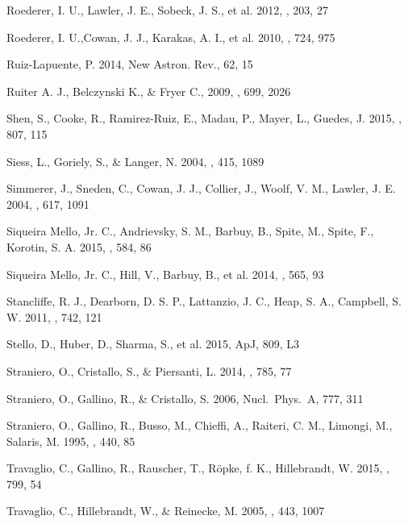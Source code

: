 \documentclass[manuscript]{aastex}
\begin{document}
\begin{thebibliography}{}
Roederer, I. U., Lawler, J. E., Sobeck, J. S., et al. 2012, \apjs, 203, 27

Roederer, I. U.,Cowan, J. J., Karakas, A. I., et al. 2010, \apj, 724, 975

Ruiz-Lapuente, P. 2014, New Astron. Rev., 62, 15

Ruiter A. J., Belczynski K., \& Fryer C., 2009, \apj, 699, 2026

Shen, S., Cooke, R., Ramirez-Ruiz, E., Madau, P., Mayer, L., Guedes, J. 2015,
\apj, 807, 115

Siess, L., Goriely, S., \& Langer, N. 2004, \aap, 415, 1089

Simmerer, J., Sneden, C., Cowan, J. J., Collier, J., Woolf, V. M., Lawler, J. E. 2004,
\apj, 617, 1091

Siqueira Mello, Jr. C., Andrievsky, S. M., Barbuy, B., Spite, M.,
Spite, F., Korotin, S. A. 2015, \aap, 584, 86

Siqueira Mello, Jr. C., Hill, V., Barbuy, B., et al. 2014, \aap, 565, 93

Stancliffe, R. J., Dearborn, D. S. P., Lattanzio, J. C., Heap, S. A.,  
Campbell, S. W. 2011, \apj, 742, 121

Stello, D., Huber, D., Sharma, S., et al. 2015, ApJ, 809, L3

Straniero, O., Cristallo, S., \& Piersanti, L. 2014, \apj, 785, 77

Straniero, O., Gallino, R., \& Cristallo, S. 2006, Nucl.\ Phys.\ A, 777, 311

Straniero, O., Gallino, R., Busso, M., Chieffi, A., Raiteri, C. M., Limongi, M., 
Salaris, M. 1995, \apj, 440, 85

 Travaglio, C., Gallino, R., Rauscher, T.,
R{\"o}pke, f. K., Hillebrandt, W. 2015, \apj, 799, 54

Travaglio, C., Hillebrandt, W., \& Reinecke, M. 2005, \aap, 443, 1007


\end{thebibliography}
\end{document}
